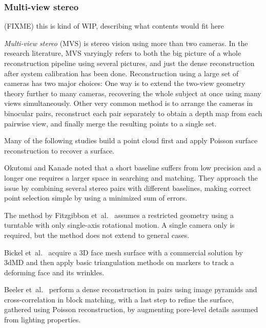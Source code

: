 
\subsubsection{Multi-view stereo} %


{ \color{red} (FIXME) this is kind of WIP, describing what contents would fit here }

\emph{Multi-view stereo} (MVS) is stereo vision using more than two cameras.
In the research literature, MVS varyingly refers to both the big picture of a whole reconstruction pipeline using several pictures, and just the dense reconstruction after system calibration has been done.
Reconstruction using a large set of cameras has two major choices:
One way is to extend the two-view geometry theory further to many cameras, recovering the whole subject at once using many views simultaneously.
Other very common method is to arrange the cameras in binocular pairs, reconstruct each pair separately to obtain a depth map from each pairwise view, and finally merge the resulting points to a single set.

Many of the following studies build a point cloud first and apply Poisson surface reconstruction \cite{kazhdan2006poisson} to recover a surface.

Okutomi and Kanade \cite{okutomi1993multiple} noted that a short baseline suffers from low precision and a longer one requires a larger space in searching and matching.
They approach the issue by combining several stereo pairs with different baselines, making correct point selection simple by using a minimized sum of errors.

The method by Fitzgibbon et~al.\ \cite{fitzgibbon1998automatic} assumes a restricted geometry using a turntable with only single-axis rotational motion.
A single camera only is required, but the method does not extend to general cases.

Bickel et~al.\ \cite{bickel2007multi} acquire a 3D face mesh surface with a commercial solution by 3dMD \cite{3dmd} and then apply basic triangulation methods on markers to track a deforming face and its wrinkles.

Beeler et~al.\ \cite{beeler2010high} perform a dense reconstruction in pairs using image pyramids and cross-correlation in block matching, with a last step to refine the surface, gathered using Poisson reconstruction, by augmenting pore-level details assumed from lighting properties.

